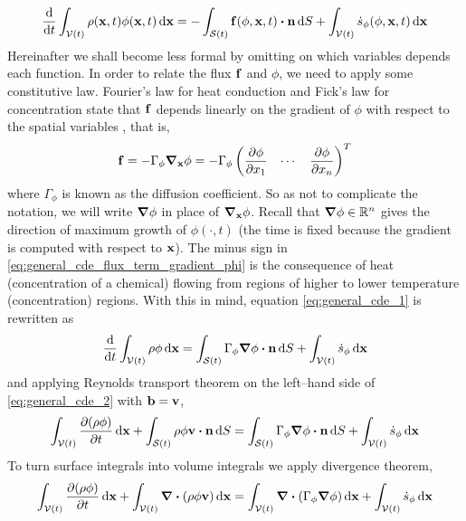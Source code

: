 \begin{equation} \label{eq:general_cde_1}
	\frac{\dd}{\dd{t}} \int_{\cvt} \rho(\vb{x}, t) \phi(\vb{x}, t) \dd{\vb{x}} = 
	- \int_{\cst} \vb{f}(\phi, \vb{x}, t) \vdot \vb{n} \dd{S} 
	+ \int_{\cvt} \dot{s}_\phi (\phi, \vb{x}, t) \dd{\vb{x}}	
\end{equation}
Hereinafter we shall become less formal by omitting on which variables depends each function. In order to relate the flux $\vb{f}$ and $\phi$, we need to apply some constitutive law. Fourier's law for heat conduction and Fick's law for concentration state that $\vb{f}$ depends linearly on the gradient of $\phi$ with respect to the spatial variables \cite{evans1998heat}, that is,
\begin{equation} \label{eq:general_cde_flux_term_gradient_phi}
	\vb{f} = 
	-\Gamma_\phi \grad_{\vb{x}} \phi = 
	-\Gamma_\phi
	\begin{pmatrix}
		\displaystyle\pdv{\phi}{x_1} & \cdots & \displaystyle\pdv{\phi}{x_n}
	\end{pmatrix}^T
\end{equation}
where $\Gamma_\phi$ is known as the diffusion coefficient. So as not to complicate the notation, we will write $\grad{\phi}$ in place of $\grad_{\vb{x}} \phi$. Recall that $\grad{\phi} \in \mathbb{R}^n$ gives the direction of maximum growth of $\phi(\cdot, t)$ (the time is fixed because the gradient is computed with respect to $\vb{x}$). The minus sign in \eqref{eq:general_cde_flux_term_gradient_phi} is the consequence of heat (concentration of a chemical) flowing from regions of higher to lower temperature (concentration) regions. With this in mind, equation \eqref{eq:general_cde_1} is rewritten as
\begin{equation} \label{eq:general_cde_2}
	\frac{\dd}{\dd{t}} \int_{\cvt} \rho \phi \dd{\vb{x}} = 
	\int_{\cst} \Gamma_\phi \grad{\phi} \vdot \vb{n} \dd{S} +
	\int_{\cvt} \dot{s}_\phi \dd{\vb{x}}	
\end{equation}
and applying Reynolds transport theorem on the left--hand side of \eqref{eq:general_cde_2} with $\vb{b} = \vb{v}$,
\begin{equation}
	\int_{\cvt} \pdv{(\rho \phi)}{t} \dd{\vb{x}} + 
	\int_{\cst} \rho \phi \vb{v} \vdot \vb{n} \dd{S} = 
	\int_{\cst} \Gamma_\phi \grad{\phi} \vdot \vb{n} \dd{S} +
	\int_{\cvt} \dot{s}_\phi \dd{\vb{x}}	
\end{equation}
To turn surface integrals into volume integrals we apply divergence theorem,
\begin{equation}
	\int_{{\mathcal{V}(t)}} \pdv{(\rho \phi)}{t} \dd{\vb{x}} + 
	\int_{{\mathcal{V}(t)}} \div(\rho \phi \vb{v}) \dd{\vb{x}} = 
	\int_{{\mathcal{V}(t)}} \div(\Gamma_\phi \grad{\phi}) \dd{\vb{x}} + 
	\int_{{\mathcal{V}(t)}} \dot{s}_\phi \dd{\vb{x}}	
\end{equation}
